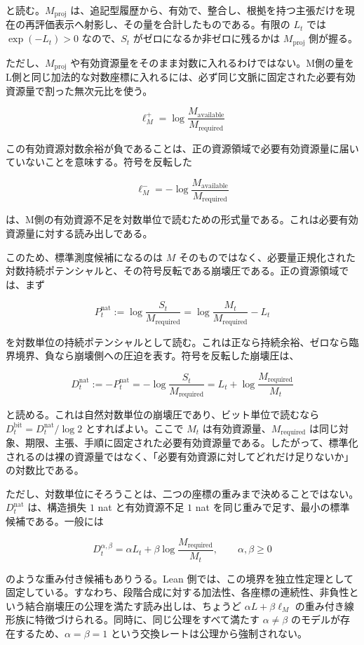 \documentclass[12pt,a4paper]{article}
\begin{document}
と読む。\(M_{\mathrm{proj}}\) は、追記型履歴から、有効で、整合し、根拠を持つ主張だけを現在の再評価表示へ射影し、その量を合計したものである。有限の \(L_t\) では \(\exp(-L_t)>0\) なので、\(S_t\) がゼロになるか非ゼロに残るかは \(M_{\mathrm{proj}}\) 側が握る。

ただし、\(M_{\mathrm{proj}}\) や有効資源量をそのまま対数に入れるわけではない。M側の量を L側と同じ加法的な対数座標に入れるには、必ず同じ文脈に固定された必要有効資源量で割った無次元比を使う。

\[
\ell_M^+
=\log\frac{M_{\mathrm{available}}}{M_{\mathrm{required}}}
\]

この有効資源対数余裕が負であることは、正の資源領域で必要有効資源量に届いていないことを意味する。符号を反転した

\[
\ell_M^-
=-\log\frac{M_{\mathrm{available}}}{M_{\mathrm{required}}}
\]

は、M側の有効資源不足を対数単位で読むための形式量である。これは必要有効資源量に対する読み出しである。

このため、標準測度候補になるのは \(M\) そのものではなく、必要量正規化された対数持続ポテンシャルと、その符号反転である崩壊圧である。正の資源領域では、まず

\[
P_t^{\mathrm{nat}}
:=\log\frac{S_t}{M_{\mathrm{required}}}
=\log\frac{M_t}{M_{\mathrm{required}}}-L_t
\]

を対数単位の持続ポテンシャルとして読む。これは正なら持続余裕、ゼロなら臨界境界、負なら崩壊側への圧迫を表す。符号を反転した崩壊圧は、

\[
D_t^{\mathrm{nat}} :=-P_t^{\mathrm{nat}}
=-\log\frac{S_t}{M_{\mathrm{required}}}
=L_t+\log\frac{M_{\mathrm{required}}}{M_t}
\]

と読める。これは自然対数単位の崩壊圧であり、ビット単位で読むなら \(D_t^{\mathrm{bit}}=D_t^{\mathrm{nat}}/\log 2\) とすればよい。ここで \(M_t\) は有効資源量、\(M_{\mathrm{required}}\) は同じ対象、期限、主張、手順に固定された必要有効資源量である。したがって、標準化されるのは裸の資源量ではなく、「必要有効資源に対してどれだけ足りないか」の対数比である。

ただし、対数単位にそろうことは、二つの座標の重みまで決めることではない。\(D_t^{\mathrm{nat}}\) は、構造損失 \(1\) nat と有効資源不足 \(1\) nat を同じ重みで足す、最小の標準候補である。一般には

\[
D_t^{\alpha,\beta}
=\alpha L_t+\beta\log\frac{M_{\mathrm{required}}}{M_t},
\qquad \alpha,\beta\geq 0
\]

のような重み付き候補もありうる。Lean 側では、この境界を独立性定理として固定している。すなわち、段階合成に対する加法性、各座標の連続性、非負性という結合崩壊圧の公理を満たす読み出しは、ちょうど \(\alpha L+\beta\ell_M\) の重み付き線形族に特徴づけられる。同時に、同じ公理をすべて満たす \(\alpha\neq\beta\) のモデルが存在するため、\(\alpha=\beta=1\) という交換レートは公理から強制されない。
\end{document}
